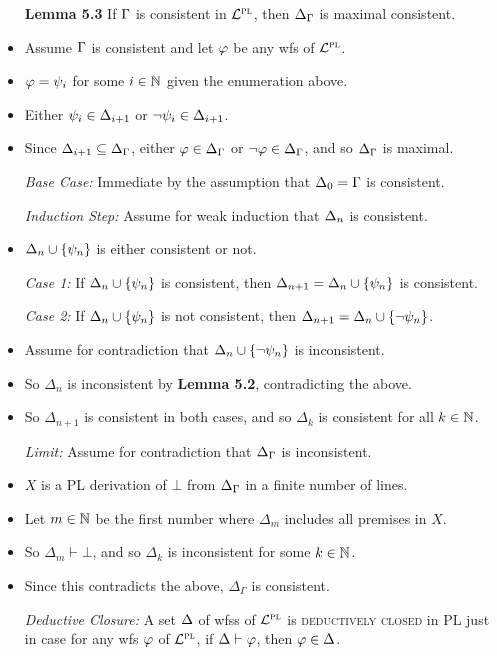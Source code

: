 \documentclass[a4paper, 11pt]{article} %
\begin{document}
\begin{itemize}
  \item[\bf Lemma 5.3] If $\Gamma$ is consistent in $\mathcal{L}^{\textsc{pl}}$, then $\Delta_{\Gamma}$ is maximal consistent. 
    \item Assume $\Gamma$ is consistent and let $\varphi$ be any wfs of $\mathcal{L}^{\textsc{pl}}$.
    \item $\varphi=\psi_i$ for some $i\in\mathbb{N}$ given the enumeration above.
    \item Either $\psi_i\in\Delta_{i+1}$ or $\neg\psi_i\in\Delta_{i+1}$.
    \item Since $\Delta_{i+1}\subseteq\Delta_{\Gamma}$, either $\varphi\in\Delta_{\Gamma}$ or $\neg\varphi\in\Delta_{\Gamma}$, and so $\Delta_{\Gamma}$ is maximal.
    \item[\it Base Case:] Immediate by the assumption that $\Delta_0 = \Gamma$ is consistent. 
    \item[\it Induction Step:] Assume for weak induction that $\Delta_n$ is consistent. 
      \item $\Delta_n\cup\lbrace\psi_n\rbrace$ is either consistent or not.
      \item[\it Case 1:] If $\Delta_n\cup\lbrace\psi_n\rbrace$ is consistent, then $\Delta_{n+1}=\Delta_n\cup\lbrace\psi_n\rbrace$ is consistent. 
      \item[\it Case 2:] If $\Delta_n\cup\lbrace\psi_n\rbrace$ is not consistent, then $\Delta_{n+1}=\Delta_n\cup\lbrace\neg\psi_n\rbrace$.
    \item Assume for contradiction that $\Delta_n\cup\lbrace\neg\psi_n\rbrace$ is inconsistent.
    \item So $\Delta_n$ is inconsistent by \textbf{Lemma 5.2}, contradicting the above. 
    \item So $\Delta_{n+1}$ is consistent in both cases, and so $\Delta_k$ is consistent for all $k \in \mathbb{N}$. 
    \item[\it Limit:] Assume for contradiction that $\Delta_{\Gamma}$ is inconsistent.
    \item $X$ is a PL derivation of $\bot$ from $\Delta_{\Gamma}$ in a finite number of lines.
    \item Let $m \in \mathbb{N}$ be the first number where $\Delta_m$ includes all premises in $X$.
    \item So $\Delta_m\vdash\bot$, and so $\Delta_k$ is inconsistent for some $k\in\mathbb{N}$.
    \item Since this contradicts the above, $\Delta_\Gamma$ is consistent. 
  \item[\it Deductive Closure:] A set $\Delta$ of wfss of $\mathcal{L}^{\textsc{pl}}$ is \textsc{deductively closed} in PL just in case for any wfs $\varphi$ of $\mathcal{L}^{\textsc{pl}}$, if $\Delta\vdash\varphi$, then $\varphi\in\Delta$.

\end{itemize}
\end{document}
